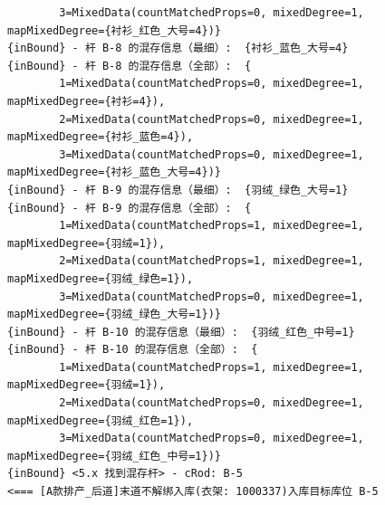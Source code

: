 {\begin{verbatim}
		3=MixedData(countMatchedProps=0, mixedDegree=1, mapMixedDegree={衬衫_红色_大号=4})}
{inBound} - 杆 B-8 的混存信息（最细）:  {衬衫_蓝色_大号=4}
{inBound} - 杆 B-8 的混存信息（全部）:  {
		1=MixedData(countMatchedProps=0, mixedDegree=1, mapMixedDegree={衬衫=4}), 
		2=MixedData(countMatchedProps=0, mixedDegree=1, mapMixedDegree={衬衫_蓝色=4}), 
		3=MixedData(countMatchedProps=0, mixedDegree=1, mapMixedDegree={衬衫_蓝色_大号=4})}
{inBound} - 杆 B-9 的混存信息（最细）:  {羽绒_绿色_大号=1}
{inBound} - 杆 B-9 的混存信息（全部）:  {
		1=MixedData(countMatchedProps=1, mixedDegree=1, mapMixedDegree={羽绒=1}), 
		2=MixedData(countMatchedProps=1, mixedDegree=1, mapMixedDegree={羽绒_绿色=1}), 
		3=MixedData(countMatchedProps=0, mixedDegree=1, mapMixedDegree={羽绒_绿色_大号=1})}
{inBound} - 杆 B-10 的混存信息（最细）:  {羽绒_红色_中号=1}
{inBound} - 杆 B-10 的混存信息（全部）:  {
		1=MixedData(countMatchedProps=1, mixedDegree=1, mapMixedDegree={羽绒=1}), 
		2=MixedData(countMatchedProps=0, mixedDegree=1, mapMixedDegree={羽绒_红色=1}), 
		3=MixedData(countMatchedProps=0, mixedDegree=1, mapMixedDegree={羽绒_红色_中号=1})}
{inBound} <5.x 找到混存杆> - cRod: B-5
<=== [A款排产_后道]末道不解绑入库(衣架: 1000337)入库目标库位 B-5
\end{verbatim}
}